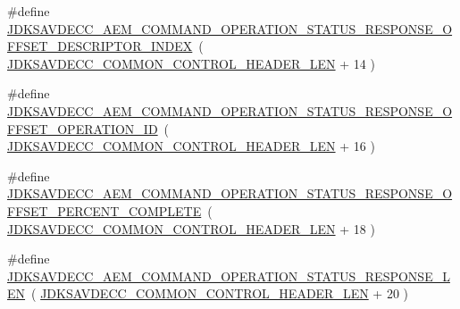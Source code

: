\begin{DoxyCompactItemize}
\item 
\#define \hyperlink{group__command__operation__status__response_ga6947f422fa0e53dea1175a1a72377a63}{J\+D\+K\+S\+A\+V\+D\+E\+C\+C\+\_\+\+A\+E\+M\+\_\+\+C\+O\+M\+M\+A\+N\+D\+\_\+\+O\+P\+E\+R\+A\+T\+I\+O\+N\+\_\+\+S\+T\+A\+T\+U\+S\+\_\+\+R\+E\+S\+P\+O\+N\+S\+E\+\_\+\+O\+F\+F\+S\+E\+T\+\_\+\+D\+E\+S\+C\+R\+I\+P\+T\+O\+R\+\_\+\+I\+N\+D\+EX}~( \hyperlink{group__jdksavdecc__avtp__common__control__header_gaae84052886fb1bb42f3bc5f85b741dff}{J\+D\+K\+S\+A\+V\+D\+E\+C\+C\+\_\+\+C\+O\+M\+M\+O\+N\+\_\+\+C\+O\+N\+T\+R\+O\+L\+\_\+\+H\+E\+A\+D\+E\+R\+\_\+\+L\+EN} + 14 )
\item 
\#define \hyperlink{group__command__operation__status__response_ga49add79cdd0b78d093392c5f782bee92}{J\+D\+K\+S\+A\+V\+D\+E\+C\+C\+\_\+\+A\+E\+M\+\_\+\+C\+O\+M\+M\+A\+N\+D\+\_\+\+O\+P\+E\+R\+A\+T\+I\+O\+N\+\_\+\+S\+T\+A\+T\+U\+S\+\_\+\+R\+E\+S\+P\+O\+N\+S\+E\+\_\+\+O\+F\+F\+S\+E\+T\+\_\+\+O\+P\+E\+R\+A\+T\+I\+O\+N\+\_\+\+ID}~( \hyperlink{group__jdksavdecc__avtp__common__control__header_gaae84052886fb1bb42f3bc5f85b741dff}{J\+D\+K\+S\+A\+V\+D\+E\+C\+C\+\_\+\+C\+O\+M\+M\+O\+N\+\_\+\+C\+O\+N\+T\+R\+O\+L\+\_\+\+H\+E\+A\+D\+E\+R\+\_\+\+L\+EN} + 16 )
\item 
\#define \hyperlink{group__command__operation__status__response_gaa2602da3dd1f95ce53fe533913c9c802}{J\+D\+K\+S\+A\+V\+D\+E\+C\+C\+\_\+\+A\+E\+M\+\_\+\+C\+O\+M\+M\+A\+N\+D\+\_\+\+O\+P\+E\+R\+A\+T\+I\+O\+N\+\_\+\+S\+T\+A\+T\+U\+S\+\_\+\+R\+E\+S\+P\+O\+N\+S\+E\+\_\+\+O\+F\+F\+S\+E\+T\+\_\+\+P\+E\+R\+C\+E\+N\+T\+\_\+\+C\+O\+M\+P\+L\+E\+TE}~( \hyperlink{group__jdksavdecc__avtp__common__control__header_gaae84052886fb1bb42f3bc5f85b741dff}{J\+D\+K\+S\+A\+V\+D\+E\+C\+C\+\_\+\+C\+O\+M\+M\+O\+N\+\_\+\+C\+O\+N\+T\+R\+O\+L\+\_\+\+H\+E\+A\+D\+E\+R\+\_\+\+L\+EN} + 18 )
\item 
\#define \hyperlink{group__command__operation__status__response_ga156c52d1c043f8962f3dade1b85b7325}{J\+D\+K\+S\+A\+V\+D\+E\+C\+C\+\_\+\+A\+E\+M\+\_\+\+C\+O\+M\+M\+A\+N\+D\+\_\+\+O\+P\+E\+R\+A\+T\+I\+O\+N\+\_\+\+S\+T\+A\+T\+U\+S\+\_\+\+R\+E\+S\+P\+O\+N\+S\+E\+\_\+\+L\+EN}~( \hyperlink{group__jdksavdecc__avtp__common__control__header_gaae84052886fb1bb42f3bc5f85b741dff}{J\+D\+K\+S\+A\+V\+D\+E\+C\+C\+\_\+\+C\+O\+M\+M\+O\+N\+\_\+\+C\+O\+N\+T\+R\+O\+L\+\_\+\+H\+E\+A\+D\+E\+R\+\_\+\+L\+EN} + 20 )
\end{DoxyCompactItemize}
